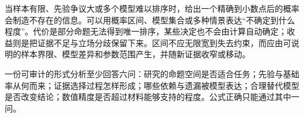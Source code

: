 当样本有限、先验争议大或多个模型难以排序时，给出一个精确到小数点后的概率会制造不存在的信息。可以用概率区间、模型集合或多种情景表达“不确定到什么程度”。代价是部分命题无法得到唯一排序，某些决定也不会由计算自动确定；收益则是把证据不足与立场分歧保留下来。区间不应无限宽到失去约束，而应由可说明的样本界限、模型差异和参数范围产生，并随新证据收窄或移动。

\begin{argumentbox}
一份可审计的形式分析至少回答六问：研究的命题空间是否适合任务；先验与基础率从何而来；证据选择过程怎样形成；哪些依赖与遗漏被模型表达；合理替代模型是否改变结论；数值精度是否超过材料能够支持的程度。公式正确只能通过其中一问。
\end{argumentbox}
